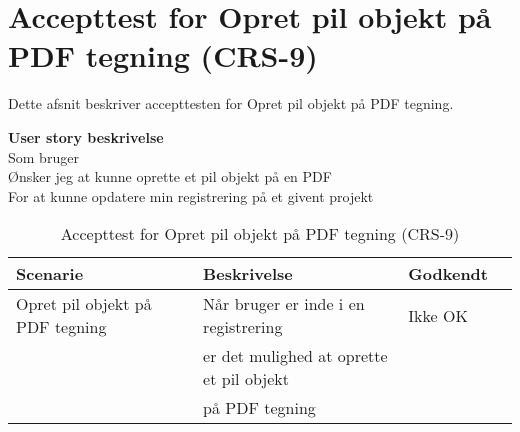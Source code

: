 \section{Accepttest for Opret pil objekt på PDF tegning (CRS-9)}
Dette afsnit beskriver accepttesten for Opret pil objekt på PDF tegning.

\textbf{User story beskrivelse} \\
Som bruger \\
Ønsker jeg at kunne oprette et pil objekt på en PDF \\
For at kunne opdatere min registrering på et givent projekt

\begin{table}[H]
	\centering
	\begin{tabular}{|ll|l|ll|} \hline
		\textbf{Scenarie} &  & \textbf{Beskrivelse}&  \textbf{Godkendt}&  \\ \hline
		Opret pil objekt på PDF tegning&  &  Når bruger er inde i en registrering &  Ikke OK&  \\
		& & er det mulighed at oprette et pil objekt& & \\ 
		& & på PDF tegning& & \\ \hline
	\end{tabular}
	\caption{Accepttest for Opret pil objekt på PDF tegning (CRS-9)}
	\label{AcceptPil}
\end{table}